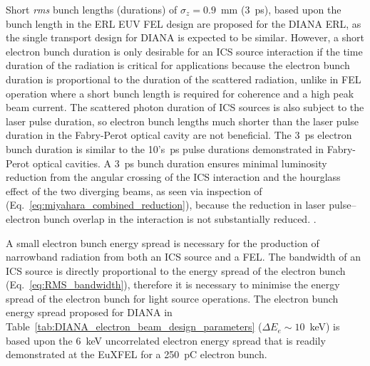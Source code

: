 \documentclass[../main.tex]{subfiles}
\begin{document}
Short \textit{rms} bunch lengths (durations) of $\sigma_{z}=0.9$~\si{\milli\meter} (3~\si{\pico\second}), based upon the bunch length in the ERL EUV FEL design \cite{akkermans2017compact} are proposed for the DIANA ERL, as the single transport design for DIANA is expected to be similar. However, a short electron bunch duration is only desirable for an ICS source interaction if the time duration of the radiation is critical for applications because the electron bunch duration is proportional to the duration of the scattered radiation, unlike in FEL operation where a short bunch length is required for coherence and a high peak beam current. The scattered photon duration of ICS sources is also subject to the laser pulse duration, so electron bunch lengths much shorter than the laser pulse duration in the Fabry-Perot optical cavity are not beneficial. The 3~\si{\pico\second} electron bunch duration is similar to the 10's~\si{\pico\second} pulse durations demonstrated in Fabry-Perot optical cavities. A 3~\si{\pico\second} bunch duration ensures minimal luminosity reduction from the angular crossing of the ICS interaction and the hourglass effect of the two diverging beams, as seen via inspection of (Eq.~\ref{eq:miyahara_combined_reduction}), because the reduction in laser pulse--electron bunch overlap in the interaction is not substantially reduced.  . 

A small electron bunch energy spread is necessary for the production of narrowband radiation from both an ICS source and a FEL. The bandwidth of an ICS source is directly proportional to the energy spread of the electron bunch (Eq.~\ref{eq:RMS_bandwidth}), therefore it is necessary to minimise the energy spread of the electron bunch for light source operations. The electron bunch energy spread proposed for DIANA in Table~\ref{tab:DIANA_electron_beam_design_parameters} ($\Delta E_{e} \sim 10$~\si{\kilo\electronvolt}) is based upon the 6~\si{\kilo\electronvolt} uncorrelated electron energy spread that is readily demonstrated at the EuXFEL \cite{tomin2021accurate} for a 250~\si{\pico\coulomb} electron bunch. 
\end{document}
